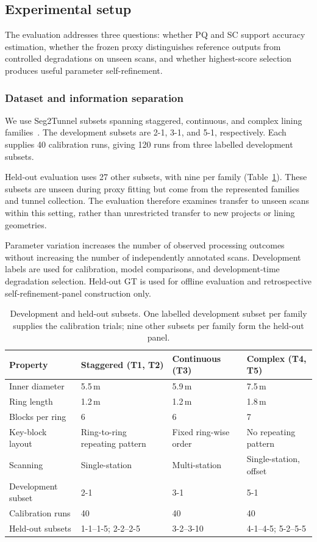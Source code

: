 \documentclass[a4paper,fleqn]{cas-dc}
\begin{document}
{\subsection{Experimental setup}
\label{sec:exp-setup}

The evaluation addresses three questions: whether PQ and SC support accuracy estimation, whether the frozen proxy distinguishes reference outputs from controlled degradations on unseen scans, and whether highest-score selection produces useful parameter self-refinement.


\subsubsection{Dataset and information separation}
\label{sec:dataset}

We use Seg2Tunnel subsets spanning staggered, continuous, and complex lining families~\cite{lin2024seg2tunnel}. The development subsets are 2-1, 3-1, and 5-1, respectively. Each supplies 40 calibration runs, giving 120 runs from three labelled development subsets.

Held-out evaluation uses 27 other subsets, with nine per family (Table~\ref{tab:dataset}). These subsets are unseen during proxy fitting but come from the represented families and tunnel collection. The evaluation therefore examines transfer to unseen scans within this setting, rather than unrestricted transfer to new projects or lining geometries.

Parameter variation increases the number of observed processing outcomes without increasing the number of independently annotated scans. Development labels are used for calibration, model comparisons, and development-time degradation selection. Held-out GT is used for offline evaluation and retrospective self-refinement-panel construction only.

\begin{table}[t]
\caption{Development and held-out subsets. One labelled development subset per family supplies the calibration trials; nine other subsets per family form the held-out panel.}
\label{tab:dataset}
\centering
\begin{tabular}{p{} p{} p{} p{}}
\toprule
Property & Staggered (T1, T2) & Continuous (T3) & Complex (T4, T5) \\
\midrule
Inner diameter & 5.5\,m & 5.9\,m & 7.5\,m \\
Ring length & 1.2\,m & 1.2\,m & 1.8\,m \\
Blocks per ring & 6 & 6 & 7 \\
Key-block layout & Ring-to-ring repeating pattern & Fixed ring-wise order & No repeating pattern \\
Scanning & Single-station & Multi-station & Single-station, offset \\
Development subset & 2-1 & 3-1 & 5-1 \\
Calibration runs & 40 & 40 & 40 \\
Held-out subsets & 1-1--1-5; 2-2--2-5 & 3-2--3-10 & 4-1--4-5; 5-2--5-5 \\
\bottomrule
\end{tabular}
\end{table}


}
\end{document}
